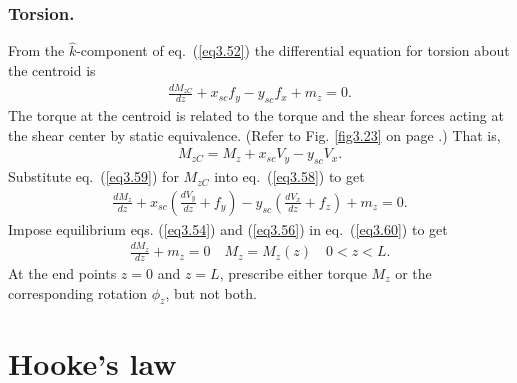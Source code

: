 \documentclass{AeroStructure-ERJohnson}
\begin{document}
\subsubsection{Torsion.} From the $\hat{k}$-component of eq.~(\ref{eq3.52}) the differential equation for torsion about the centroid  is
\begin{align}\label{eq3.58}
\frac{d M_{z C}}{d z}+x_{sc} f_{y}-y_{sc} f_{x}+m_{z}=0.
\end{align}
The torque at the centroid is related to the torque and the shear forces acting at the shear center by static equivalence. (Refer to Fig. \ref{fig3.23} on page \pageref{fig3.23}.) That is,
\begin{align}\label{eq3.59}
M_{z C}=M_{z}+x_{s c} V_{y}-y_{s c} V_{x}.
\end{align}
Substitute eq.~(\ref{eq3.59}) for $M_{z C}$ into eq.~(\ref{eq3.58}) to get
\begin{align}\label{eq3.60}
\frac{d M_{z}}{d z}+x_{s c}\left(\frac{d V_{y}}{d z}+f_{y}\right)-y_{s c}\left(\frac{d V_{x}}{d z}+f_{z}\right)+m_{z}=0.
\end{align}
Impose equilibrium eqs. (\ref{eq3.54}) and (\ref{eq3.56}) in eq.~(\ref{eq3.60}) to get
\begin{align}\label{eq3.61}
\frac{d M_{z}}{d z}+m_{z}=0 \quad M_{z}=M_{z}(z) \quad 0<z<L.
\end{align}
At the end points $z = 0$ and $z=L$, prescribe either torque $M_z$ or the corresponding rotation $\phi_{z}$, but not both\vspace*{6pt}.

\clearpage

\section{Hooke's law}\label{sec3.7}
\end{document}

